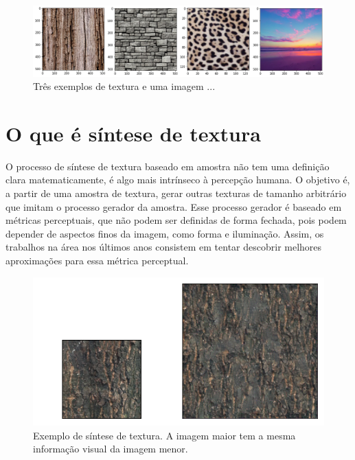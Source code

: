 \begin{figure}[!ht]
	\includegraphics[width=\linewidth]{files/assets/texture.png}
	\caption{Três exemplos de textura e uma imagem ...}
	\label{img:preview}
\end{figure}


 

\section{O que é síntese de textura}


O processo de síntese de textura baseado
em amostra não tem uma definição clara
matematicamente, é algo mais intrínseco
à percepção humana. O objetivo é,
a partir de uma amostra de textura,
gerar outras texturas de tamanho
arbitrário que imitam o processo
gerador da amostra. Esse processo
gerador é baseado em métricas
perceptuais, que não podem ser
definidas de forma fechada, pois
podem depender de aspectos
finos da imagem, como forma e 
iluminação.
Assim, os trabalhos na área
nos últimos anos consistem em
tentar descobrir melhores aproximações
para essa métrica perceptual.

\begin{figure}[!ht]
	\centering
	\includegraphics[width=\linewidth*2/3]{files/assets/sinth.png}
	\caption{Exemplo de síntese de textura. A imagem
	maior tem a mesma informação visual da imagem
	menor.}
	\label{img:preview}
\end{figure}


